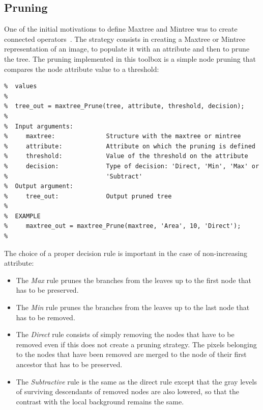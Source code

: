 \documentclass[DIV=calc, paper=a4, fontsize=11pt]{scrartcl}	 %
\begin{document}
\subsection{Pruning}
One of the initial motivations to define Maxtree and Mintree was to create connected operators~\cite{Salembier-IEEEIP-1995,Salembier-SPMag-2009}. The strategy consists in creating a Maxtree or Mintree representation of an image, to populate it with an attribute and then to prune the tree. The pruning implemented in this toolbox is a simple node pruning that compares the node attribute value to a threshold: 
\begin{lstlisting}[aboveskip=0.5 \baselineskip]
%  maxtree_Prune prunes a mintree or a maxtree based on some attribute
%  values
%
%  tree_out = maxtree_Prune(tree, attribute, threshold, decision);
%
%  Input arguments:
%     maxtree:              Structure with the maxtree or mintree 
%     attribute:            Attribute on which the pruning is defined
%     threshold:            Value of the threshold on the attribute 
%     decision:             Type of decision: 'Direct, 'Min', 'Max' or
%                           'Subtract'
%  Output argument:
%     tree_out:             Output pruned tree 
%
%  EXAMPLE
%     maxtree_out = maxtree_Prune(maxtree, 'Area', 10, 'Direct');
%
\end{lstlisting}
The choice of a proper decision rule is important in the case of non-increasing attribute: 
\begin{itemize}
\item The {\em Max} rule prunes the branches from the leaves up to the first node that has to be preserved.
\item The {\em Min} rule prunes the branches from the leaves up to the last node that has to be removed.
\item The {\em Direct} rule consists of simply removing the nodes that have to be removed even if this does not create a pruning strategy. The pixels belonging to the nodes that have been removed are merged to the node of their first ancestor that has to be preserved.
\item The {\em Subtractive} rule is the same as the direct rule except that the gray levels of surviving descendants of removed nodes are also lowered, so that the contrast with the local background remains the same.
\end{itemize}
\end{document}
